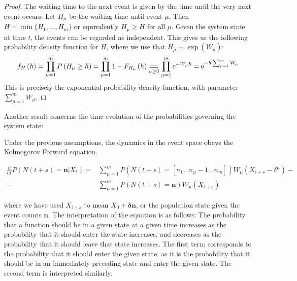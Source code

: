 \documentclass[10pt,a4paper]{article}
\begin{document}
\begin{proof}
	The waiting time to the next event is given by the time until the very next event occurs. Let $H_\mu$ be the waiting time until event $\mu$. Then	$H = \min \{ H_1, \ldots, H_m \}$ or equivalently $H_\mu \geq H \textrm{ for all } \mu$. Given the system state at time $t$, the events can be regarded as independent. This gives us the following probability density function for $H$, where we use that $H_\mu \sim \exp \left( W_\mu \right)$:
	\begin{align*}
		f_{H} \left( h \right) = \prod_{\mu = 1}^m P \left( H_\mu \geq h \right) = \prod_{\mu =1}^m 1 - F_{H_\mu}\left( h \right) \underset{h\geq 0}{=\joinrel=} \prod_{\mu = 1}^m \mathrm{e}^{-W_{\mu} h} = \mathrm{e}^{- h \sum_{\mu = 1}^m W_\mu}
	\end{align*}
	This is precisely the exponential probability density function, with parameter $\sum_{\mu = 1}^m W_\mu$.
\end{proof}

Another result concerns the time-evolution of the probabilities governing the system state:

\begin{theorem}
	Under the previous assumptions, the dynamics in the event space obeys the Kolmogorov Forward equation.
	
	\begin{align}
		\frac{\textrm{d}}{\textrm{d}t} P \left( N \left( t + s \right) = \bm{n} | X_t \right) =
		&  \sum_{\mu = 1}^m P \left( N \left( t + s \right) = \left[ n_1 \ldots n_\mu - 1 \ldots n_m \right] \right) W_{\mu} \left( X_ {t+s} - \delta^{\mu} \right) - \\
		- & \sum_{\mu = 1}^m P \left( N \left( t + s \right) = \bm{n} \right) W_{\mu} \left( X_{t+s} \right) \label{eq:kolmogorov_forward}
	\end{align} \label{th:kolmogorov_forward}
\end{theorem}

where we have used $X_{t+s}$ to mean $X_0 + \bm{\delta}\bm{n}$, or the population state given the event counts $\bm{n}$. The interpretation of the equation is as follows: The probability that a function should be in a given state at a given time increases as the probability that it should enter the state increases, and decreases as the probability that it should leave that state increases. The first term corresponds to the probability that it should enter the given state, as it is the probability that it should be in an immediately preceding state and enter the given state. The second term is interpreted similarly.
\end{document}
